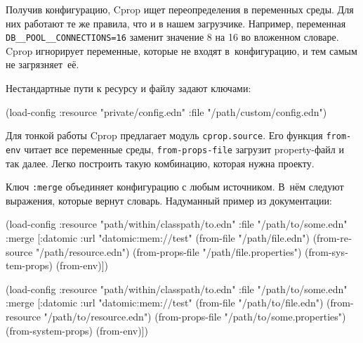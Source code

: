 Получив конфигурацию, Cprop ищет переопределения в переменных среды. Для них
работают те же правила, что и в нашем загрузчике. Например, переменная
\texttt{DB\_\_POOL\_\_CONNEC\-TIONS=16} заменит значение 8 на 16 во вложенном
словаре. Cprop игнорирует переменные, которые не входят в~конфигурацию, и тем
самым не загрязняет~её.

Нестандартные пути к ресурсу и файлу задают ключами:

\begin{english}
  \begin{clojure}
(load-config
 :resource "private/config.edn"
 :file "/path/custom/config.edn")
  \end{clojure}
\end{english}


Для тонкой работы Cprop предлагает модуль \verb|cprop.source|. Его функция
\verb|from-env| читает все переменные среды, \texttt{from\--props\--file}
загрузит property-файл и так далее. Легко построить такую комбинацию, которая
нужна проекту.

Ключ \verb|:merge| объединяет конфигурацию с любым источником. В~нём следуют
выражения, которые вернут словарь. Надуманный пример из документации:

\ifnarrow

\begin{english}
  \begin{clojure}
(load-config
 :resource "path/within/classpath/to.edn"
 :file "/path/to/some.edn"
 :merge
 [{:datomic {:url "datomic:mem://test"}}
  (from-file "/path/file.edn")
  (from-resource "/path/resource.edn")
  (from-props-file "/path/file.properties")
  (from-system-props)
  (from-env)])
  \end{clojure}
\end{english}

\else

\begin{english}
  \begin{clojure}
(load-config
 :resource "path/within/classpath/to.edn"
 :file "/path/to/some.edn"
 :merge [{:datomic {:url "datomic:mem://test"}}
         (from-file "/path/to/file.edn")
         (from-resource "/path/to/resource.edn")
         (from-props-file "/path/to/some.properties")
         (from-system-props)
         (from-env)])
  \end{clojure}
\end{english}

\fi

